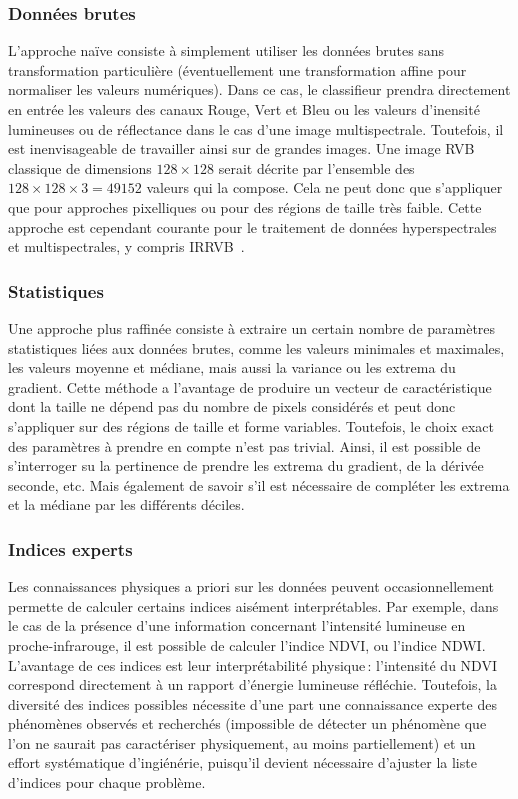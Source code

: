 \subsubsection{Données brutes}

L'approche naïve consiste à simplement utiliser les données brutes sans transformation particulière (éventuellement une transformation affine pour normaliser les valeurs numériques). Dans ce cas, le classifieur prendra directement en entrée les valeurs des canaux Rouge, Vert et Bleu ou les valeurs d'inensité lumineuses ou de réflectance dans le cas d'une image multispectrale. Toutefois, il est inenvisageable de travailler ainsi sur de grandes images. Une image RVB classique de dimensions $128\times128$ serait décrite par l'ensemble des $128\times128\times3 = 49152$ valeurs qui la compose. Cela ne peut donc que s'appliquer que pour approches pixelliques ou pour des régions de taille très faible. Cette approche est cependant courante pour le traitement de données hyperspectrales~\cite{fauvel_advances_2013,ham_investigation_2005} et multispectrales, y compris \gls{IRRVB}~\cite{dechesne_semantic_2017}.

\subsubsection{Statistiques}

Une approche plus raffinée consiste à extraire un certain nombre de paramètres statistiques liées aux données brutes, comme les valeurs minimales et maximales, les valeurs moyenne et médiane, mais aussi la variance ou les extrema du gradient. Cette méthode a l'avantage de produire un vecteur de caractéristique dont la taille ne dépend pas du nombre de pixels considérés et peut donc s'appliquer sur des régions de taille et forme variables. Toutefois, le choix exact des paramètres à prendre en compte n'est pas trivial. Ainsi, il est possible de s'interroger su la pertinence de prendre les extrema du gradient, de la dérivée seconde, etc. Mais également de savoir s'il est nécessaire de compléter les extrema et la médiane par les différents déciles.

\subsubsection{Indices experts}

Les connaissances physiques a priori sur les données peuvent occasionnellement permette de calculer certains indices aisément interprétables. Par exemple, dans le cas de la présence d'une information concernant l'intensité lumineuse en proche-infrarouge, il est possible de calculer l'indice NDVI, ou l'indice NDWI. L'avantage de ces indices est leur interprétabilité physique\,: l'intensité du NDVI correspond directement à un rapport d'énergie lumineuse réfléchie. Toutefois, la diversité des indices possibles nécessite d'une part une connaissance experte des phénomènes observés et recherchés (impossible de détecter un phénomène que l'on ne saurait pas caractériser physiquement, au moins partiellement) et un effort systématique d'ingiénérie, puisqu'il devient nécessaire d'ajuster la liste d'indices pour chaque problème.

